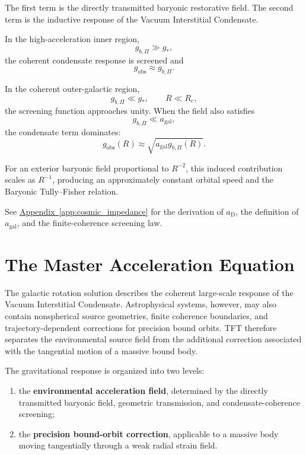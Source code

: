 The first term is the directly transmitted baryonic restorative field. The second term is the inductive response of the Vacuum Interstitial Condensate.

In the high-acceleration inner region,
\begin{equation}
    g_{b,\Pi} \gg g_*,
\end{equation}
the coherent condensate response is screened and
\begin{equation}
    g_{\mathrm{obs}} \approx g_{b,\Pi}.
\end{equation}

In the coherent outer-galactic region,
\begin{equation}
    g_{b,\Pi} \ll g_*, \qquad R \ll R_{\mathrm{c}},
\end{equation}
the screening function approaches unity. When the field also satisfies
\begin{equation}
    g_{b,\Pi} \ll a_{\mathrm{gal}},
\end{equation}
the condensate term dominates:
\begin{equation}
    g_{\mathrm{obs}}(R) \approx \sqrt{ a_{\mathrm{gal}}g_{b,\Pi}(R) }.
\end{equation}

For an exterior baryonic field proportional to $R^{-2}$, this induced contribution scales as $R^{-1}$, producing an approximately constant orbital speed and the Baryonic Tully--Fisher relation.

See \hyperref[app:cosmic_impedance]{Appendix~\ref*{app:cosmic_impedance}} for the derivation of $a_{\mathrm{D}}$, the definition of $a_{\mathrm{gal}}$, and the finite-coherence screening law.

\section{The Master Acceleration Equation}
\label{sec:master_acceleration_equation}

The galactic rotation solution describes the coherent large-scale response of the Vacuum Interstitial Condensate. Astrophysical systems, however, may also contain nonspherical source geometries, finite coherence boundaries, and trajectory-dependent corrections for precision bound orbits. TFT therefore separates the environmental source field from the additional correction associated with the tangential motion of a massive bound body.

The gravitational response is organized into two levels:
\begin{enumerate}
    \item the \textbf{environmental acceleration field}, determined by the directly transmitted baryonic field, geometric transmission, and condensate-coherence screening;
    \item the \textbf{precision bound-orbit correction}, applicable to a massive body moving tangentially through a weak radial strain field.
\end{enumerate}

